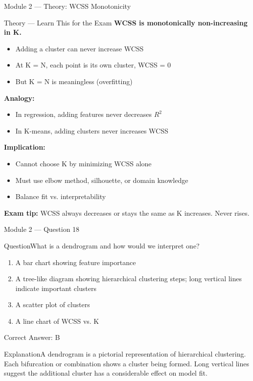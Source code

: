 \documentclass[aspectratio=169,10pt]{beamer}
\newcommand{\question}[1]{\begin{block}{Question}#1\end{block}}
\newcommand{\options}[4]{%
	\begin{enumerate}[label=\Alph*.,leftmargin=*]
		\item #1
		\item #2
		\item #3
		\item #4
	\end{enumerate}
}
\newcommand{\answerbox}[1]{\begin{exampleblock}{Correct Answer: #1}\end{exampleblock}}
\newcommand{\explain}[1]{\begin{block}{Explanation}#1\end{block}}
\newcommand{\theory}[1]{%
	\begin{block}{Theory --- Learn This for the Exam}
		\small #1
	\end{block}
}
\begin{document}
	\begin{frame}{Module 2 --- Theory: WCSS Monotonicity}
		\theory{
			\textbf{WCSS is monotonically non-increasing in K.}
			\begin{itemize}
				\item Adding a cluster can never increase WCSS
				\item At K = N, each point is its own cluster, WCSS = 0
				\item But K = N is meaningless (overfitting)
			\end{itemize}
			\textbf{Analogy:}
			\begin{itemize}
				\item In regression, adding features never decreases $R^2$
				\item In K-means, adding clusters never increases WCSS
			\end{itemize}
			\textbf{Implication:}
			\begin{itemize}
				\item Cannot choose K by minimizing WCSS alone
				\item Must use elbow method, silhouette, or domain knowledge
				\item Balance fit vs. interpretability
			\end{itemize}
			\textbf{Exam tip:} WCSS always decreases or stays the same as K increases. Never rises.
		}
	\end{frame}
	
	\begin{frame}{Module 2 --- Question 18}
		\question{What is a dendrogram and how would we interpret one?}
		\options{A bar chart showing feature importance}{A tree-like diagram showing hierarchical clustering steps; long vertical lines indicate important clusters}{A scatter plot of clusters}{A line chart of WCSS vs. K}
		\answerbox{B}
		\explain{A dendrogram is a pictorial representation of hierarchical clustering. Each bifurcation or combination shows a cluster being formed. Long vertical lines suggest the additional cluster has a considerable effect on model fit.}
	\end{frame}
	
\end{document}
